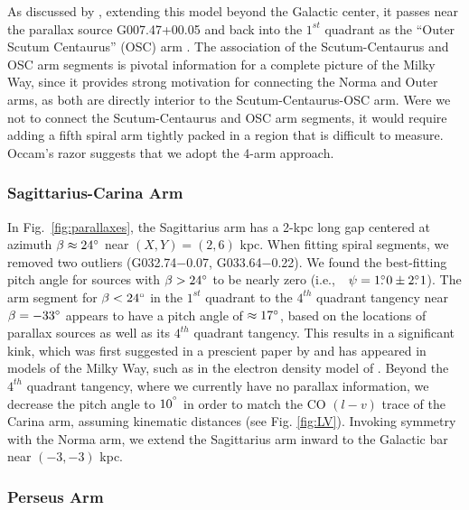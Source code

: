 \documentclass[12pt,preprint]{aastex}
\def\deg  {\ifmmode {^\circ}\else {$^\circ$}\fi}
\def\ie   {i.e.,~}
\def\d    {\ifmmode {{\rlap{.}}^\circ}\else {${\rlap{.}}^\circ$}\fi}
\begin{document}
As discussed by \citet{Sanna17}, extending this model beyond the Galactic center, it 
passes near the parallax source G007.47+00.05 and back into the $1^{st}$ quadrant as the
``Outer Scutum Centaurus'' (OSC) arm \citep{Dame:11,Sun:15}.
The association of the Scutum-Centaurus and OSC arm segments is pivotal information
for a complete picture of the Milky Way, since it provides strong motivation for 
connecting the Norma and Outer arms, as both are directly interior to the 
Scutum-Centaurus-OSC arm.  Were we not to connect the Scutum-Centaurus and OSC arm 
segments, it would require adding a fifth spiral arm tightly packed in a region 
that is difficult to measure.  Occam's razor suggests that we adopt the 4-arm approach.

\subsubsection{Sagittarius-Carina Arm}

In Fig.~\ref{fig:parallaxes}, the Sagittarius arm has a 2-kpc long gap centered at 
azimuth $\beta\approx24\deg$ near $(X,Y) = (2,6)$ kpc.  When fitting
spiral segments, we removed two outliers (G032.74$-$0.07, G033.64$-$0.22). 
We found the best-fitting pitch angle for sources
with $\beta>24\deg$ to be nearly zero (\ie\ $\psi=1\d0\pm2\d1$). 
The arm segment for $\beta<24\deg$ in the $1^{st}$ quadrant to the $4^{th}$ quadrant 
tangency near $\beta=-33\deg$  appears to have a pitch angle of 
$\approx17\deg$, based on the locations of parallax sources as well as its 
$4^{th}$ quadrant tangency.
This results in a significant kink, which was first suggested in a prescient
paper by \citet{Burton:70} and has appeared in models of the Milky
Way, such as in the electron density model of \citet{Taylor:93}.  
Beyond the $4^{th}$ quadrant tangency, where we currently have no parallax
information, we decrease the pitch angle to $10^\deg$ in order to match the
CO $(l-v)$ trace of the Carina arm, assuming kinematic distances (see Fig. \ref{fig:LV}).
Invoking symmetry with the Norma arm, we extend the Sagittarius arm inward to the
Galactic bar near $(-3,-3)$ kpc.

\subsubsection{Perseus Arm}
\end{document}
